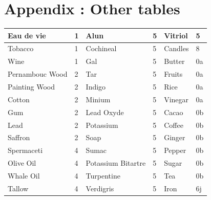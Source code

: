 \documentclass[12pt,a4paper,titlepage]{article}
\begin{document}
\newpage
\section{Appendix : Other tables}
\begin{center}

\begin{tabular}{ | l | l | l | l | l | l | }
\hline
	Eau de vie & 1 & Alun & 5 & Vitriol & 5 \\ \hline
	Tobacco & 1 & Cochineal & 5 & Candles & 8 \\ \hline
	Wine & 1 & Gal & 5 & Butter & 0a \\ \hline
	Pernambouc Wood & 2 & Tar & 5 & Fruits & 0a \\ \hline
	Painting Wood & 2 & Indigo & 5 & Rice & 0a \\ \hline
	Cotton & 2 & Minium  & 5 & Vinegar & 0a \\ \hline
	Gum & 2 & Lead Oxyde & 5 & Cacao & 0b \\ \hline
	Lead & 2 & Potassium & 5 & Coffee & 0b \\ \hline
	Saffron & 2 & Soap & 5 & Ginger & 0b \\ \hline
	Spermaceti & 4 & Sumac & 5 & Pepper & 0b \\ \hline
	Olive Oil & 4 & Potassium Bitartre & 5 & Sugar & 0b \\ \hline
	Whale Oil & 4 & Turpentine & 5 & Tea & 0b \\ \hline
	Tallow & 4 & Verdigris & 5 & Iron & 6j \\ \hline
\end{tabular}
\end{center}
\end{document}
